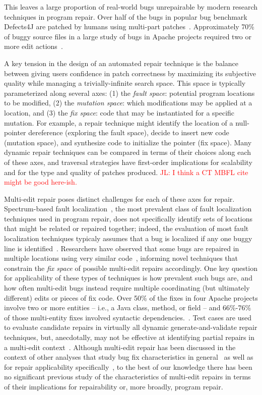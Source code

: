 \documentclass[sigconf, timestamp-false, anonymous=true]{acmart}
\newcommand\todo[1]{\textcolor{red}{#1}}
\begin{document}
This leaves a large proportion of real-world bugs unrepairable by modern
research techniques in program repair.  Over half of the bugs in popular bug
benchmark Defects4J are patched by humans using multi-part
patches~\cite{d4j-dissection}. Approximately 70\% of buggy source files in a
large study of bugs in Apache projects required two or more edit
actions~\cite{zhong2015}.

A key tension in the design of an automated repair technique is the balance
between giving users confidence in patch correctness by maximizing its
subjective quality while managing a trivially-infinite search space. This space
is typically parameterized along several axes: (1) the \emph{fault space}:
potential program locations to be modified, (2) the \emph{mutation space}: which
modifications may be applied at a location, and (3) the \emph{fix space}: code
that may be instantiated for a specific mutation. For example, a repair
technique might identify the location of a null-pointer dereference (exploring
the fault space), decide to insert new code (mutation space), and synthesize
code to initialize the pointer (fix space). Many dynamic repair techniques can
be compared in terms of their choices along each of these axes, and traversal
strategies have first-order implications for scalability and for the type and
quality of patches produced. \todo{JL: I think a CT MBFL cite might be good here-ish.}

Multi-edit repair poses distinct challenges for each of these axes for repair.
Spectrum-based fault localization~\cite{ochiai}, the most prevalent class of
fault localization techniques used in program repair, does not specifically
identify sets of locations that might be related or repaired together; indeed,
the evaluation of most fault localization techniques typicaly assumes that a bug
is localized if any one buggy line is identified~\cite{fl-survey-wong}.
Researchers have observed that some bugs are
repaired in multiple locations using very similar
code~\cite{saha2019harnessing,jiang2019cmsuggester}, informing novel techniques
that constrain the \emph{fix space} of possible multi-edit repairs accordingly.
One key question for applicability of these types of techniques is how prevalent
such bugs are, and how often multi-edit bugs instead require multiple
coordinating (but ultimately different) edits or pieces of fix code.  Over 50\% of the fixes in four 
Apache projects involve two or more entities -- i.e., a Java class, method, or field -- and 66\%-76\% of 
those multi-entity fixes involved syntactic dependencies.~\cite{wang2018}. 
Test cases are used to evaluate candidate repairs in virtually all dynamic
generate-and-validate repair techniques, but, anecdotally, may not be effective
at identifying partial repairs in a multi-edit
context~\cite{fitness10,maybeeric}.  
Although multi-edit repair has been discussed in the context of other analyses
that study bug fix characteristics in general~\cite{examples} as well as for
repair applicability specifically~\cite{moar,examples}, to the best of our
knowledge there has been no significant previous study of the characteristics of
multi-edit repairs in terms of their implications for repairability or, more
broadly, program repair.  
\end{document}
